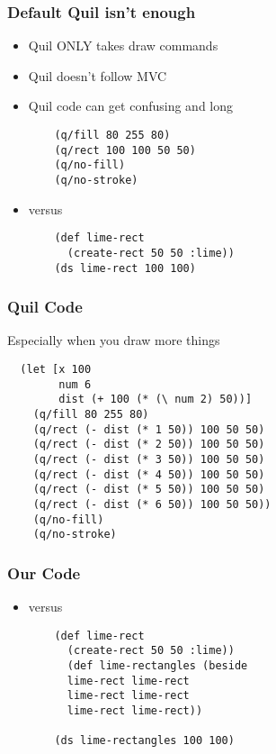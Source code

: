 \documentclass{beamer}
\begin{document}
\begin{frame}[fragile]
\frametitle{Default Quil isn't enough}
	\begin{itemize}
		\item Quil ONLY takes draw commands
		\item Quil doesn't follow MVC
		\item Quil code can get confusing and long
		
			\begin{verbatim}
	(q/fill 80 255 80)
	(q/rect 100 100 50 50)
	(q/no-fill)
	(q/no-stroke)
			\end{verbatim}	
		\item versus
		\begin{verbatim}
	(def lime-rect 
	  (create-rect 50 50 :lime))
	(ds lime-rect 100 100)
			\end{verbatim}
	\end{itemize}
\end{frame}


\begin{frame}[fragile]
\frametitle{Quil Code}
	\item Especially when you draw more things
	\begin{itemize}
			\begin{verbatim}
  (let [x 100
  		num 6
  		dist (+ 100 (* (\ num 2) 50))]
	(q/fill 80 255 80)
	(q/rect (- dist (* 1 50)) 100 50 50)
	(q/rect (- dist (* 2 50)) 100 50 50)
	(q/rect (- dist (* 3 50)) 100 50 50)
	(q/rect (- dist (* 4 50)) 100 50 50)
	(q/rect (- dist (* 5 50)) 100 50 50)
	(q/rect (- dist (* 6 50)) 100 50 50))
	(q/no-fill)
	(q/no-stroke)
			\end{verbatim}	
	\end{itemize}
\end{frame}

\begin{frame}[fragile]
\frametitle{Our Code}
	\begin{itemize}
		\item versus
		\begin{verbatim}
	(def lime-rect 
	  (create-rect 50 50 :lime))
	  (def lime-rectangles (beside 
	  lime-rect lime-rect
	  lime-rect lime-rect
	  lime-rect lime-rect))
	  						  
	(ds lime-rectangles 100 100)
			\end{verbatim}
	\end{itemize}
\end{frame}
\end{document}
